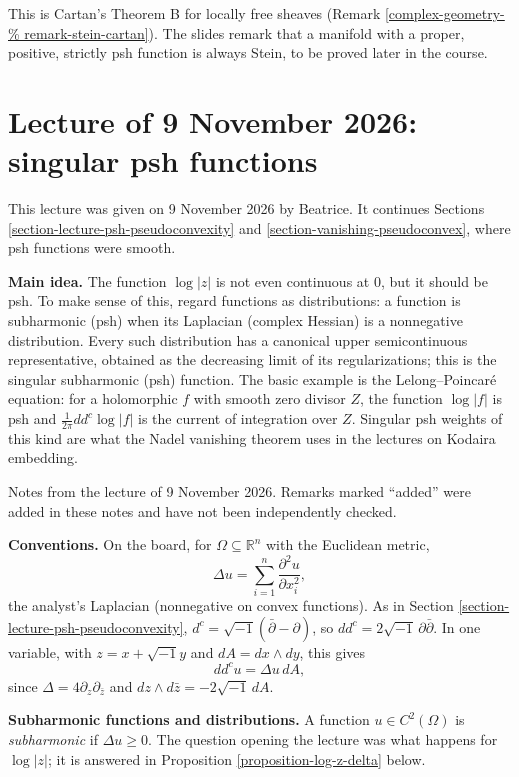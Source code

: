 \noindent
This is Cartan's Theorem B for locally free
sheaves (Remark
\ref{complex-geometry-%
remark-stein-cartan}).
The slides remark that a manifold with a
proper, positive, strictly psh function is
always Stein, to be proved later in the
course.


\section{Lecture of 9 November 2026:
singular psh functions}
\label{section-singular-psh-functions}

\noindent
This lecture was given on 9 November 2026 by
Beatrice. It continues Sections
\ref{section-lecture-psh-pseudoconvexity}
and
\ref{section-vanishing-pseudoconvex}, where
psh functions were smooth.

\medskip\noindent
{\bf Main idea.} The function $\log|z|$ is
not even continuous at $0$, but it should be
psh. To make sense of this, regard functions
as distributions: a function is subharmonic
(psh) when its Laplacian (complex Hessian) is
a nonnegative distribution. Every such
distribution has a canonical upper
semicontinuous representative, obtained as
the decreasing limit of its regularizations;
this is the singular subharmonic (psh)
function. The basic example is the
Lelong--Poincar\'e equation: for a
holomorphic $f$ with smooth zero divisor
$Z$, the function $\log|f|$ is psh and
$\frac{1}{2\pi}dd^c\log|f|$ is the current of
integration over $Z$. Singular psh weights of
this kind are what the Nadel vanishing
theorem uses in the lectures on Kodaira
embedding.

\medskip\noindent
Notes from the lecture of 9 November 2026.
Remarks marked ``added'' were added in these
notes and have not been independently
checked.

\medskip\noindent
{\bf Conventions.} On the board, for
$\Omega\subseteq\mathbb{R}^n$ with the
Euclidean metric,
$$
\Delta u=\sum_{i=1}^n
\frac{\partial^2u}{\partial x_i^2},
$$
the analyst's Laplacian (nonnegative on
convex functions). As in Section
\ref{section-lecture-psh-pseudoconvexity},
$d^c=\sqrt{-1}(\bar\partial-\partial)$, so
$dd^c=2\sqrt{-1}\,\partial\bar\partial$. In
one variable, with $z=x+\sqrt{-1}y$ and
$dA=dx\wedge dy$, this gives
$$
dd^cu=\Delta u\,dA,
$$
since $\Delta=4\partial_z\partial_{\bar z}$
and $dz\wedge d\bar z=-2\sqrt{-1}\,dA$.

\medskip\noindent
{\bf Subharmonic functions and
distributions.} A function $u\in
C^2(\Omega)$ is \emph{subharmonic} if $\Delta
u\geq 0$. The question opening the lecture
was what happens for $\log|z|$; it is
answered in Proposition
\ref{proposition-log-z-delta} below.

